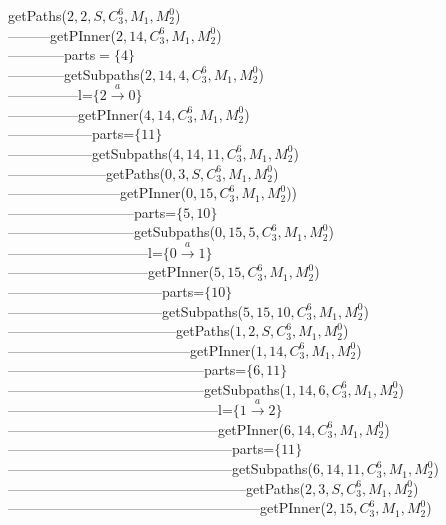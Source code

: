 
{\tiny
getPaths($2,2,S,C_3^6,M_1,M_2^0$) \\
---------getPInner($2,14,C_3^6,M_1,M_2^0$)\\
------------parts$=\{4\}$\\
------------getSubpaths($2,14,4,C_3^6,M_1,M_2^0$)\\
---------------l=$\{2 \xrightarrow{a} 0\}$\\
---------------getPInner($4,14,C_3^6,M_1,M_2^0$)\\
------------------parts=$\{11\}$\\
------------------getSubpaths($4,14,11,C_3^6,M_1,M_2^0$)\\
---------------------getPaths($0,3,S,C_3^6,M_1,M_2^0$)\\
------------------------getPInner($0,15,C_3^6,M_1,M_2^0$))\\
---------------------------parts=$\{5,10\}$\\
---------------------------getSubpaths($0,15,5,C_3^6,M_1,M_2^0$)\\
------------------------------l=$\{0 \xrightarrow{a} 1\}$\\
------------------------------getPInner($5,15,C_3^6,M_1,M_2^0$)\\
---------------------------------parts=$\{10\}$\\
---------------------------------getSubpaths($5,15,10,C_3^6,M_1,M_2^0$)\\
------------------------------------getPaths($1,2,S,C_3^6,M_1,M_2^0$)\\
---------------------------------------getPInner($1,14,C_3^6,M_1,M_2^0$)\\
------------------------------------------parts=$\{6,11\}$\\
------------------------------------------getSubpaths($1,14,6,C_3^6,M_1,M_2^0$)\\
---------------------------------------------l=$\{1 \xrightarrow{a} 2\}$\\
---------------------------------------------getPInner($6,14,C_3^6,M_1,M_2^0$)\\
------------------------------------------------parts=$\{11\}$\\
------------------------------------------------getSubpaths($6,14,11,C_3^6,M_1,M_2^0$)\\
---------------------------------------------------getPaths($2,3,S,C_3^6,M_1,M_2^0$)\\
------------------------------------------------------getPInner($2,15,C_3^6,M_1,M_2^0$)\\
}
